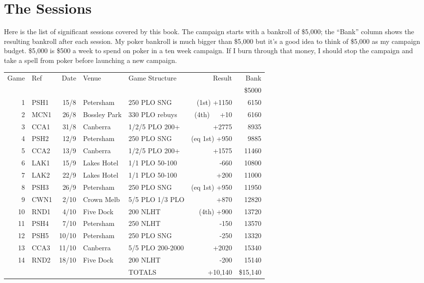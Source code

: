 \chapter{The Sessions}

Here is the list of significant sessions covered by this book. The
campaign starts with a bankroll of \$5,000; the ``Bank'' column shows
the resulting bankroll after each session. My poker bankroll is much
bigger than \$5,000 but it's a good idea to think of \$5,000 as my
campaign budget. \$5,000 is \$500 a week to spend on poker in a ten
week campaign. If I burn through that money, I should stop the
campaign and take a spell from poker before launching a new campaign.

\begin{tabular}{rlrllrr}
 Game & Ref & Date & Venue & Game Structure & Result & Bank \\
     &           &      &           &             &       & \$5000 \\
  1  &   PSH1    & 15/8 & Petersham & 250 PLO SNG & (1st) +1150 & 6150 \\
  2  &   MCN1    & 26/8 & Bossley Park & 330 PLO rebuys & (4th)~~~+10 & 6160 \\
  3  &   CCA1    & 31/8 & Canberra  & 1/2/5 PLO 200+ & +2775 & 8935 \\
  4  &   PSH2    & 12/9 & Petersham & 250 PLO SNG & (eq 1st) +950 & 9885 \\
  5  &   CCA2    & 13/9 & Canberra  & 1/2/5 PLO 200+ & +1575 & 11460 \\
  6  &   LAK1    & 15/9 & Lakes Hotel & 1/1 PLO 50-100 & -660 & 10800 \\
  7  &   LAK2    & 22/9 & Lakes Hotel & 1/1 PLO 50-100 & +200 & 11000 \\
  8  &   PSH3    & 26/9 & Petersham & 250 PLO SNG & (eq 1st) +950 & 11950 \\
  9  &   CWN1    & 2/10 & Crown Melb & 5/5 PLO 1/3 PLO & +870 & 12820 \\
 10  &   RND1    & 4/10 & Five Dock & 200 NLHT & (4th) +900 & 13720 \\
 11  &   PSH4    & 7/10 & Petersham & 250 NLHT & -150 & 13570 \\
 12  &   PSH5    & 10/10 & Petersham & 250 PLO SNG & -250 & 13320 \\
 13  &   CCA3    & 11/10 & Canberra  & 5/5 PLO 200-2000 & +2020 & 15340 \\
 14  &   RND2    & 18/10 & Five Dock & 200 NLHT & -200 & 15140 \\
     &           &       &           & TOTALS & +10,140 & \$15,140 \\
\end{tabular}

